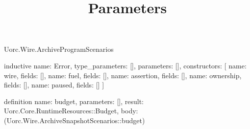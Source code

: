 \begin{lexlean}{Uorc.Wire.ArchiveProgramScenarios}
\title{Parameters}
\begin{semanticmodule}
inductive{
  name: Error,
  type_parameters: [],
  parameters: [],
  constructors: [
    {name: wire, fields: []},
    {name: fuel, fields: []},
    {name: assertion, fields: []},
    {name: ownership, fields: []},
    {name: paused, fields: []}
  ]
}

definition{
  name: budget,
  parameters: [],
  result: Uorc.Core.RuntimeResources::Budget,
  body: (Uorc.Wire.ArchiveSnapshotScenarios::budget)
}


\end{semanticmodule}
\end{lexlean}
